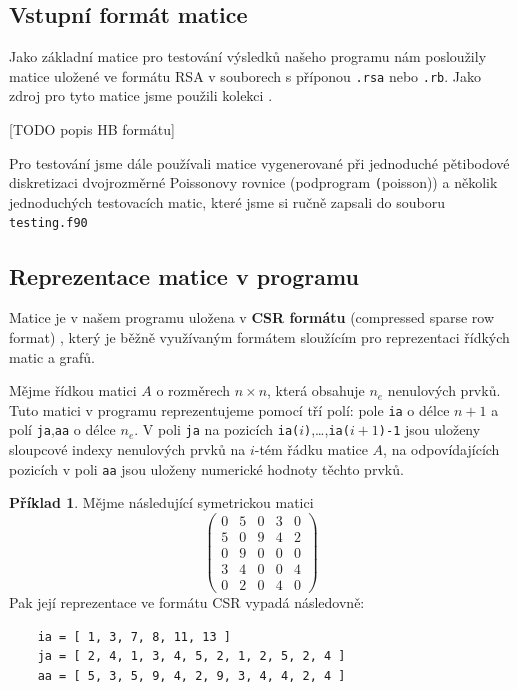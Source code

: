 \documentclass[11pt,american,czech,oneside]{book}
\theoremstyle{plain}
\theoremstyle{definition}
\newtheorem{example}{Příklad}
\begin{document}
\subsection{Vstupní formát matice}

Jako základní matice pro testování výsledků našeho programu nám posloužily matice uložené ve formátu RSA v souborech s příponou \texttt{.rsa} nebo \texttt{.rb}. Jako zdroj pro tyto matice jsme použili kolekci \cite{hbcol}.

[TODO popis HB formátu]

Pro testování jsme dále používali matice vygenerované při jednoduché pětibodové diskretizaci dvojrozměrné Poissonovy rovnice (podprogram \texttt(poisson)) a několik jednoduchých testovacích matic, které jsme si ručně zapsali do souboru \texttt{testing.f90}

\subsection{Reprezentace matice v programu}

Matice je v našem programu uložena v \textbf{CSR formátu} (compressed sparse row format) \cite{pis:84,saad:94}, který je běžně využívaným formátem sloužícím pro reprezentaci řídkých matic a grafů. 

Mějme řídkou matici $A$ o rozměrech $n \times n$, která obsahuje $n_e$ nenulových prvků. Tuto matici v programu reprezentujeme pomocí tří polí: pole \texttt{ia} o délce $n+1$ a polí \texttt{ja},\texttt{aa} o délce $n_e$. V poli \texttt{ja} na pozicích \texttt{ia($i$)},\ldots,\texttt{ia($i+1$)-1} jsou uloženy sloupcové indexy nenulových prvků na $i$-tém řádku matice $A$, na odpovídajících pozicích v poli \texttt{aa} jsou uloženy numerické hodnoty těchto prvků.

\begin{example}
  \label{CSRexample}
  Mějme následující symetrickou matici
  \[
    \begin{pmatrix}
      0 & 5 & 0 & 3 & 0 \\
      5 & 0 & 9 & 4 & 2 \\
      0 & 9 & 0 & 0 & 0 \\
      3 & 4 & 0 & 0 & 4 \\
      0 & 2 & 0 & 4 & 0
    \end{pmatrix}
  \]
  Pak její reprezentace ve formátu CSR vypadá následovně:
  \begin{verbatim}
    ia = [ 1, 3, 7, 8, 11, 13 ]
    ja = [ 2, 4, 1, 3, 4, 5, 2, 1, 2, 5, 2, 4 ]
    aa = [ 5, 3, 5, 9, 4, 2, 9, 3, 4, 4, 2, 4 ]
  \end{verbatim}
\end{example}
\end{document}
